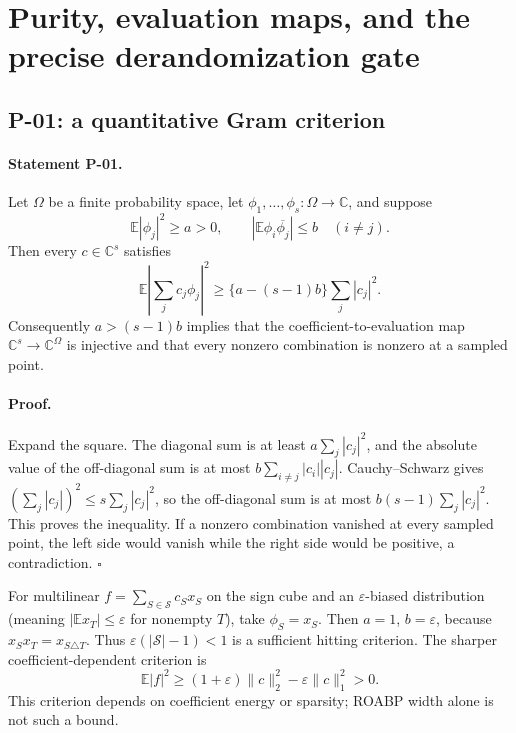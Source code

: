 \documentclass[11pt,a4paper]{article}
\theoremstyle{definition}\newtheorem{definition}{Definition}
\begin{document}

\section{Purity, evaluation maps, and the precise derandomization gate}

\subsection{P-01: a quantitative Gram criterion}
\paragraph{Statement P-01.}
Let $\Omega$ be a finite probability space, let $\phi_1,\ldots,\phi_s:\Omega\to\mathbb C$, and suppose
\[
 \mathbb E|\phi_j|^2\ge a>0,\qquad
 |\mathbb E\phi_i\overline{\phi_j}|\le b\quad(i\ne j).
\]
Then every $c\in\mathbb C^s$ satisfies
\[
 \mathbb E\left|\sum_jc_j\phi_j\right|^2
 \ge \{a-(s-1)b\}\sum_j|c_j|^2.
\]
Consequently $a>(s-1)b$ implies that the coefficient-to-evaluation map $\mathbb C^s\to\mathbb C^\Omega$ is injective and that every nonzero combination is nonzero at a sampled point.
\paragraph{Proof.}
Expand the square. The diagonal sum is at least $a\sum_j|c_j|^2$, and the absolute value of the off-diagonal sum is at most $b\sum_{i\ne j}|c_i||c_j|$. Cauchy--Schwarz gives $(\sum_j|c_j|)^2\le s\sum_j|c_j|^2$, so the off-diagonal sum is at most $b(s-1)\sum_j|c_j|^2$. This proves the inequality. If a nonzero combination vanished at every sampled point, the left side would vanish while the right side would be positive, a contradiction. $\square$

For multilinear $f=\sum_{S\in\mathcal S}c_Sx_S$ on the sign cube and an $\varepsilon$-biased distribution (meaning $|\mathbb E x_T|\le\varepsilon$ for nonempty $T$), take $\phi_S=x_S$. Then $a=1$, $b=\varepsilon$, because $x_Sx_T=x_{S\triangle T}$. Thus $\varepsilon(|\mathcal S|-1)<1$ is a sufficient hitting criterion. The sharper coefficient-dependent criterion is
\[
 \mathbb E|f|^2\ge (1+\varepsilon)\|c\|_2^2-\varepsilon\|c\|_1^2>0.
\]
This criterion depends on coefficient energy or sparsity; ROABP width alone is not such a bound.
\end{document}
